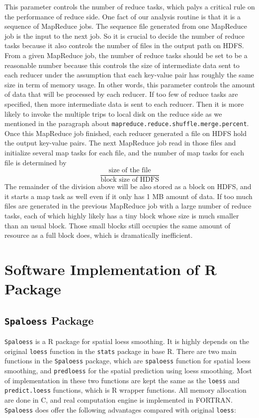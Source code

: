 This parameter controls the number of reduce tasks, which palys a critical rule
on the performance of reduce side. One fact of our analysis routine is that it is
a sequence of MapReduce jobs. The sequence file generated from one MapReduce job
is the input to the next job. So it is crucial to decide the number of reduce
tasks because it also controls the number of files in the output path on HDFS. 
From a given MapReduce job, the number of reduce tasks should be set to be a 
reasonable number because this controls the size of intermediate data sent to 
each reducer under the assumption that each key-value pair has roughly the same
size in term of memory usage. In other words, this parameter controls the amount
of data that will be processed by each reducer. If too few of reduce tasks are
specified, then more intermediate data is sent to each reducer. Then it is more
likely to invoke the multiple trips to local disk on the reduce side as we 
mentioned in the paragraph about \texttt{mapreduce.reduce.shuffle.merge.percent}.
Once this MapReduce job finished, each reducer generated a file on HDFS hold the 
output key-value pairs. The next MapReduce job read in those files and initialize
several map tasks for each file, and the number of map tasks for each file is 
determined by
\begin{equation} 
\frac{\text{size of the file}}{\text{block size of HDFS}}
\end{equation}
The remainder of the division above will be also stored as a block on HDFS, and
it starts a map task as well even if it only has 1 MB amount of data. If too much
files are generated in the previous MapReduce job with a large number of reduce
tasks, each of which highly likely has a tiny block whose size is much smaller 
than an usual block. Those small blocks still occupies the same amount of resource
as a full block does, which is dramatically inefficient. 


\section{Software Implementation of R Package}
\label{sec:Rpackage}

\subsection{\texttt{Spaloess} Package}

\texttt{Spaloess} is a R package for spatial loess smoothing. It is highly 
depends on the original \texttt{loess} function in the \texttt{stats} package
in base R. There are two main functions in the \texttt{Spaloess} package, which 
are \texttt{spaloess} function for spatial loess smoothing, and \texttt{predloess} 
for the spatial prediction using loess smoothing. Most of implementation in these
two functions are kept the same as the \texttt{loess} and \texttt{predict.loess}
functions, which is R wrapper functions. All memory allocation are done in 
C, and real computation engine is implemented in FORTRAN. \texttt{Spaloess} does
offer the following advantages compared with original \texttt{loess}:

